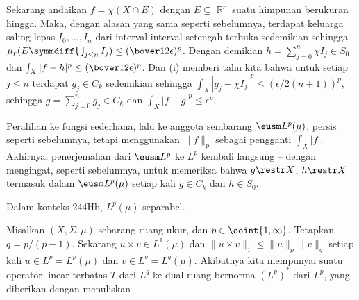 {\medskip

 Sekarang andaikan $f=\chi(X\cap E)$ dengan
$E\subseteq\BbbR^r$ suatu himpunan berukuran hingga. Maka, dengan alasan
yang sama seperti sebelumnya, terdapat keluarga saling lepas
$I_0,\ldots,I_n$ dari interval-interval setengah terbuka sedemikian
sehingga
$\mu_r(E\symmdiff\bigcup_{j\le n}I_j)\le(\bover12\epsilon)^p$.
Dengan demikian $h=\sum_{j=0}^n\chi I_j\in S_0$ dan
$\int_X|f-h|^p\le(\bover12\epsilon)^p$.
Dan (i) memberi tahu kita bahwa untuk setiap $j\le n$ terdapat
$g_j\in C_k$ sedemikian sehingga
$\int_X|g_j-\chi I_j|^p\le(\epsilon/2(n+1))^p$, sehingga
$g=\sum_{j=0}^ng_j\in C_k$ dan $\int_X|f-g|^p\le\epsilon^p$.

\medskip

 Peralihan ke fungsi sederhana, lalu ke anggota
sembarang $\eusm L^p(\mu)$, persis seperti sebelumnya, tetapi menggunakan
$\|f\|_p$ sebagai pengganti $\int_X|f|$. Akhirnya, penerjemahan dari
$\eusm L^p$ ke $L^p$ kembali langsung -- dengan mengingat, seperti
sebelumnya, untuk memeriksa bahwa $g\restr X$, $h\restr X$ termasuk dalam
$\eusm L^p(\mu)$ setiap kali $g\in C_k$ dan $h\in S_0$.
}%

 Dalam konteks 244Hb, $L^p(\mu)$ separabel.


 Misalkan $(X,\Sigma,\mu)$
sebarang ruang ukur, dan $p\in\ooint{1,\infty}$.
Tetapkan $q=p/(p-1)$. Sekarang $u\times v\in L^1(\mu)$ dan
$\|u\times v\|_1\le\|u\|_p\|v\|_q$ setiap kali
$u\in L^p=L^p(\mu)$ dan $v\in L^q=L^q(\mu)$.
Akibatnya kita mempunyai suatu operator linear terbatas $T$ dari $L^q$
ke dual ruang bernorma $(L^p)^*$ dari $L^p$, yang diberikan dengan
menuliskan

